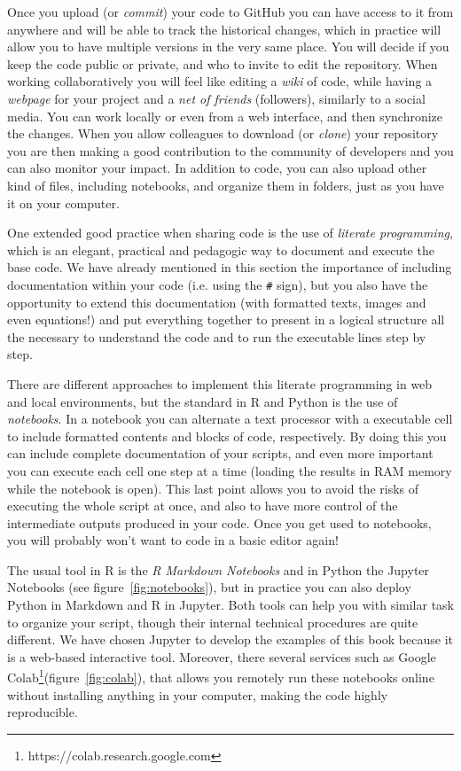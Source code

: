 Once you upload (or \textit{commit}) your code to GitHub you can have access to it from anywhere and will be able to track the historical changes, which in practice will allow you to have multiple versions in the very same place. You will decide if you keep the code public or private, and who to invite to edit the repository. When working collaboratively you will feel like editing a \textit{wiki} of code, while having a \textit{webpage} for your project and a \textit{net of friends} (followers), similarly to a social media. You can work locally or even from a web interface, and then synchronize the changes. When you allow colleagues to download (or \textit{clone}) your repository you are then making a good contribution to the community of developers and you can also monitor your impact. In addition to code, you can also upload other kind of files, including notebooks, and organize them in folders, just as you have it on your computer.

One extended good practice when sharing code is the use of \textit{literate programming}, which is an elegant, practical and pedagogic way to document and execute the base code. We have already mentioned in this section the importance of including documentation within your code (i.e. using the \texttt{\#} sign), but you also have the opportunity to extend this documentation (with formatted texts, images and even equations!) and put everything together to present in a logical structure all the necessary to understand the code and to run the executable lines step by step. 

There are different approaches to implement this literate programming in web and local environments, but the standard in R and Python is the use of \textit{notebooks}. In a notebook you can alternate a text processor with a executable cell to include formatted contents and blocks of code, respectively. By doing this you can include complete documentation of your scripts, and even more important you can execute each cell one step at a time (loading the results in RAM memory while the notebook is open). This last point allows you to avoid the risks of executing the whole script at once, and also to have more control of the intermediate outputs produced in your code. Once you get used to notebooks, you will probably won't want to code in a basic editor again!

The usual tool in R is the \textit{R Markdown Notebooks} and in Python the Jupyter Notebooks (see figure~\ref{fig:notebooks}), but in practice you can also deploy Python in Markdown and R in Jupyter. Both tools can help you with similar task to organize your script, though their internal technical procedures are quite different. We have chosen Jupyter to develop the examples of this book because it is a web-based interactive tool. Moreover, there several services such as Google Colab\footnote{https://colab.research.google.com}(figure~\ref{fig:colab}), that allows you remotely run these notebooks online without installing anything in your computer, making the code highly reproducible.

